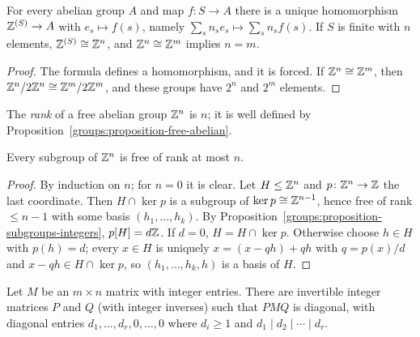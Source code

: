 \begin{proposition}\label{groups:proposition-free-abelian}
For every abelian group $A$ and map $f \colon S \to A$ there is a unique homomorphism
$\mathbb{Z}^{(S)} \to A$ with $e_s \mapsto f(s)$, namely $\sum_s n_s e_s \mapsto \sum_s n_s f(s)$. If
$S$ is finite with $n$ elements, $\mathbb{Z}^{(S)} \cong \mathbb{Z}^n$, and $\mathbb{Z}^n \cong \mathbb{Z}^m$ implies $n = m$.
\end{proposition}

\begin{proof}
The formula defines a homomorphism, and it is forced. If $\mathbb{Z}^n \cong \mathbb{Z}^m$, then
$\mathbb{Z}^n/2\mathbb{Z}^n \cong \mathbb{Z}^m/2\mathbb{Z}^m$, and these groups have $2^n$ and $2^m$ elements.
\end{proof}

\begin{definition}\label{groups:definition-rank}
The \emph{rank} of a free abelian group $\mathbb{Z}^n$ is $n$; it is well defined by
Proposition~\ref{groups:proposition-free-abelian}.
\end{definition}

\begin{proposition}\label{groups:proposition-subgroups-free}
Every subgroup of $\mathbb{Z}^n$ is free of rank at most $n$.
\end{proposition}

\begin{proof}
By induction on $n$; for $n = 0$ it is clear. Let $H \leq \mathbb{Z}^n$ and
$p \colon \mathbb{Z}^n \to \mathbb{Z}$ the last coordinate. Then $H \cap \ker p$ is a subgroup of
$\ker p \cong \mathbb{Z}^{n-1}$, hence free of rank $\leq n - 1$ with some basis $(h_1, \ldots, h_k)$.
By Proposition~\ref{groups:proposition-subgroups-integers}, $p[H] = d\mathbb{Z}$. If $d = 0$,
$H = H \cap \ker p$. Otherwise choose $h \in H$ with $p(h) = d$; every $x \in H$ is uniquely
$x = (x - q h) + qh$ with $q = p(x)/d$ and $x - qh \in H \cap \ker p$, so $(h_1, \ldots, h_k, h)$
is a basis of $H$.
\end{proof}

\begin{theorem}\label{groups:theorem-smith}
Let $M$ be an $m \times n$ matrix with integer entries. There are invertible integer
matrices $P$ and $Q$ (with integer inverses) such that $PMQ$ is diagonal, with
diagonal entries $d_1, \ldots, d_r, 0, \ldots, 0$ where $d_i \geq 1$ and
$d_1 \mid d_2 \mid \cdots \mid d_r$.
\end{theorem}

